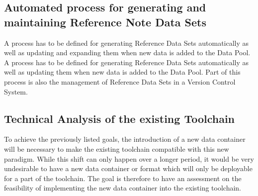 \subsection{Automated process for generating and maintaining Reference Note Data Sets}

A process has to be defined for generating Reference Data Sets automatically as well as updating and expanding them when new data is added to the Data Pool. A process has to be defined for generating Reference Data Sets automatically as well as updating them when new data is added to the Data Pool. Part of this process is also the management of Reference Data Sets in a Version Control System. 

\subsection{Technical Analysis of the existing Toolchain}

To achieve the previously listed goals, the introduction of a new data container will be necessary to make the existing toolchain compatible with this new paradigm. While this shift can only happen over a longer period, it would be very undesirable to have a new data container or format which will only be deployable for a part of the toolchain. The goal is therefore to have an assessment on the feasibility of implementing the new data container into the existing toolchain. 


